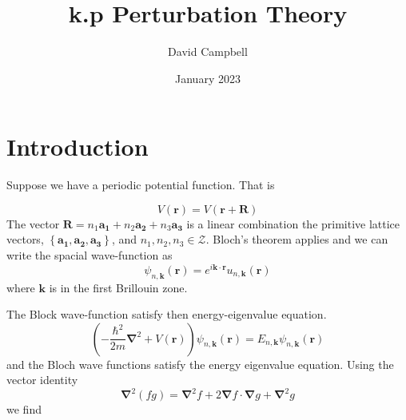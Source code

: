 \documentclass{article}
\title{k.p Perturbation Theory}
\author{David Campbell }
\date{January 2023}
\begin{document}
\maketitle

\section{Introduction}
Suppose we have a periodic potential function. That is 

\begin{equation}
    V(\mathbf{r}) = V(\mathbf{r}+\mathbf{R})
\end{equation}
The vector $\mathbf{R}=n_1 \mathbf{a_1} + n_2 \mathbf{a_2} + n_3\mathbf{a_3}$ is a linear combination the primitive lattice vectors, $\left\{ \mathbf{a_1}, \mathbf{a_2}, \mathbf{a_3}\right\}$, and $n_1, n_2, n_3 \in \mathcal{Z}$. Bloch's theorem applies and we can write the spacial wave-function as 
\begin{equation}
    \psi_{n, \mathbf{k}}(\mathbf{r}) = e^{i \mathbf{k} \cdot \mathbf{r} } u_{n, \mathbf{k}}(\mathbf{r})
\end{equation}
where $\mathbf{k}$ is in the first Brillouin zone. 

The Block wave-function satisfy then energy-eigenvalue equation.
\begin{equation}\label{Energy_Eigenvalue}
    \left( -\frac{\hbar^2}{2m}\mathbf{\nabla}^2 + V(\mathbf{r}) \right)  \psi_{n, \mathbf{k}}(\mathbf{r})  = E_{n, \mathbf{k} } \psi_{n, \mathbf{k}}(\mathbf{r})
\end{equation}
and the Bloch wave functions satisfy the energy eigenvalue equation. Using the vector identity 
\begin{equation}
    \mathbf{\nabla}^2(fg)= \mathbf{\nabla}^2f + 2 \mathbf{\nabla}f \cdot \mathbf{\nabla}g + \mathbf{\nabla}^2 g
\end{equation}
we find 
\end{document}
